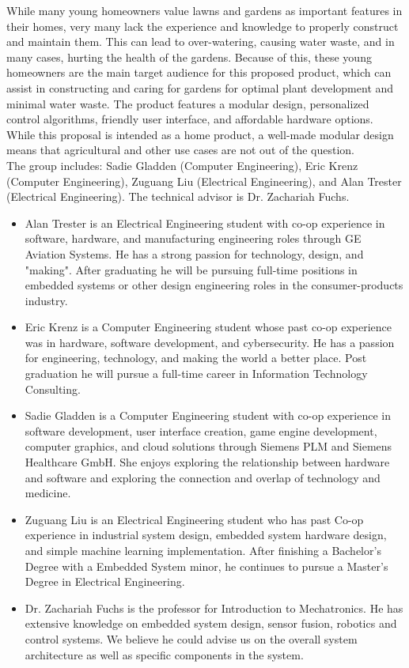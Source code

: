 \documentclass[]{article}
\begin{document}
While many young homeowners value lawns and gardens as important features in their homes, very many lack the experience and knowledge to properly construct and maintain them. This can lead to over-watering, causing water waste, and in many cases, hurting the health of the gardens. Because of this, these young homeowners are the main target audience for this proposed product, which can assist in constructing and caring for gardens for optimal plant development and minimal water waste. The product features a modular design, personalized control algorithms, friendly user interface, and affordable hardware options. While this proposal is intended as a home product, a well-made modular design means that agricultural and other use cases are not out of the question.\\

The group includes: Sadie Gladden (Computer Engineering), Eric Krenz (Computer Engineering), Zuguang Liu (Electrical Engineering), and Alan Trester (Electrical Engineering). The technical advisor is Dr. Zachariah Fuchs.
\begin{itemize}
    \item
          Alan Trester is an Electrical Engineering student with co-op experience in software, hardware, and manufacturing engineering roles through GE Aviation Systems. He has a strong passion for technology, design, and "making". After graduating he will be pursuing full-time positions in embedded systems or other design engineering roles in the consumer-products industry.
    \item
          Eric Krenz is a Computer Engineering student whose past co-op experience was in hardware, software development, and cybersecurity. He has a passion for engineering, technology, and making the world a better place. Post graduation he will pursue a full-time career in Information Technology Consulting.
    \item
          Sadie Gladden is a Computer Engineering student with co-op experience in software development, user interface creation, game engine development, computer graphics, and cloud solutions through Siemens PLM and Siemens Healthcare GmbH. She enjoys exploring the relationship between hardware and software and exploring the connection and overlap of technology and medicine.
    \item
          Zuguang Liu is an Electrical Engineering student who has past Co-op experience in industrial system design, embedded system hardware design, and simple machine learning implementation. After finishing a Bachelor's Degree with a Embedded System minor, he continues to pursue a Master's Degree in Electrical Engineering.
    \item
          Dr. Zachariah Fuchs is the professor for Introduction to Mechatronics. He has extensive knowledge on embedded system design, sensor fusion, robotics and control systems. We believe he could advise us on the overall system architecture as well as specific components in the system.
\end{itemize}
\end{document}
